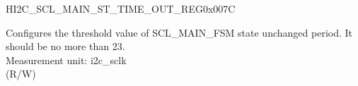 \begin{register}{H}{I2C\_SCL\_MAIN\_ST\_TIME\_OUT\_REG}{0x007C}\label{regdesc:I2CSCLMAINSTTIMEOUTREG}
%
%
\regnewline%
\begin{regdesc}\begin{reglist}
\label{fielddesc:I2CSCLMAINSTTOI2C}\item [I2C\_SCL\_MAIN\_ST\_TO\_I2C] Configures the threshold value of SCL\_MAIN\_FSM state unchanged period. It should be no more than 23.\\
Measurement unit: i2c\_sclk \\ (R/W)
\end{reglist}\end{regdesc}
\end{register}


